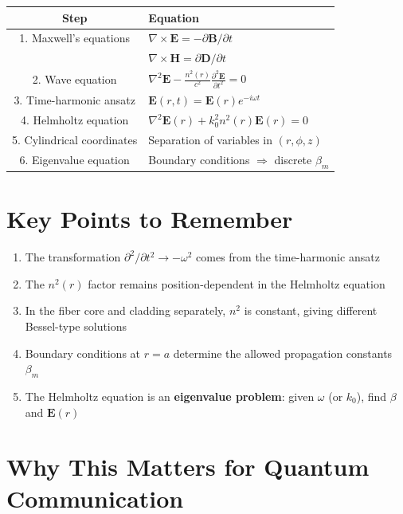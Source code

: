 \documentclass[12pt]{article}
\begin{document}
\begin{center}
\begin{tabular}{|c|l|}
\hline
\textbf{Step} & \textbf{Equation} \\
\hline
1. Maxwell's equations & $\nabla \times \mathbf{E} = -\partial \mathbf{B}/\partial t$ \\
& $\nabla \times \mathbf{H} = \partial \mathbf{D}/\partial t$ \\
\hline
2. Wave equation & $\nabla^2 \mathbf{E} - \frac{n^2(r)}{c^2} \frac{\partial^2 \mathbf{E}}{\partial t^2} = 0$ \\
\hline
3. Time-harmonic ansatz & $\mathbf{E}(r,t) = \mathbf{E}(r) e^{-i\omega t}$ \\
\hline
4. Helmholtz equation & $\nabla^2 \mathbf{E}(r) + k_0^2 n^2(r) \mathbf{E}(r) = 0$ \\
\hline
5. Cylindrical coordinates & Separation of variables in $(r, \phi, z)$ \\
\hline
6. Eigenvalue equation & Boundary conditions $\Rightarrow$ discrete $\beta_m$ \\
\hline
\end{tabular}
\end{center}

\section{Key Points to Remember}

\begin{enumerate}
\item The transformation $\partial^2/\partial t^2 \to -\omega^2$ comes from the time-harmonic ansatz

\item The $n^2(r)$ factor remains position-dependent in the Helmholtz equation

\item In the fiber core and cladding separately, $n^2$ is constant, giving different Bessel-type solutions

\item Boundary conditions at $r = a$ determine the allowed propagation constants $\beta_m$

\item The Helmholtz equation is an \textbf{eigenvalue problem}: given $\omega$ (or $k_0$), find $\beta$ and $\mathbf{E}(r)$
\end{enumerate}

\section{Why This Matters for Quantum Communication}
\end{document}
